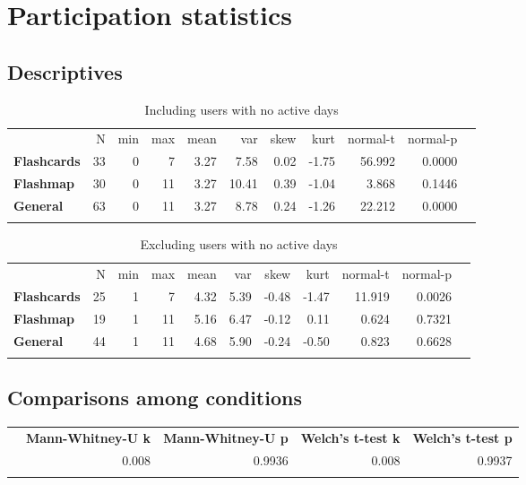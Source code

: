 \chapter{Participation statistics}
\label{app:dropouts}

\section{Descriptives}

\begin{longtable}[c]{@{}lrrrrrrrrrr@{}}
    \caption{Including users with no active days}
\endfirsthead
\toprule\addlinespace
& N & min & max & mean & var & skew & kurt & normal-t & normal-p
\\\addlinespace
\midrule
\textbf{Flashcards} & 33 & 0 & 7 & 3.27 & 7.58 & 0.02 & -1.75 & 56.992 &
0.0000
\\\addlinespace
\textbf{Flashmap} & 30 & 0 & 11 & 3.27 & 10.41 & 0.39 & -1.04 & 3.868 &
0.1446
\\\addlinespace
\textbf{General} & 63 & 0 & 11 & 3.27 & 8.78 & 0.24 & -1.26 & 22.212 &
0.0000
\\\addlinespace
\bottomrule
    \label{tab:dropouts_incl}
\end{longtable}

\begin{longtable}[c]{@{}lrrrrrrrrrr@{}}
    \caption{Excluding users with no active days}
\endfirsthead
\toprule\addlinespace
& N & min & max & mean & var & skew & kurt & normal-t & normal-p
\\\addlinespace
\midrule
\textbf{Flashcards} & 25 & 1 & 7 & 4.32 & 5.39 & -0.48 & -1.47 & 11.919
& 0.0026
\\\addlinespace
\textbf{Flashmap} & 19 & 1 & 11 & 5.16 & 6.47 & -0.12 & 0.11 & 0.624 &
0.7321
\\\addlinespace
\textbf{General} & 44 & 1 & 11 & 4.68 & 5.90 & -0.24 & -0.50 & 0.823 &
0.6628
\\\addlinespace
\bottomrule
    \label{tab:dropouts_excl}
\end{longtable}

\FloatBarrier
\section{Comparisons among conditions}

\begin{longtable}[c]{@{}lrrrr@{}}
\toprule\addlinespace
& \textbf{Mann-Whitney-U k} & \textbf{Mann-Whitney-U p} &
\textbf{Welch's t-test k} & \textbf{Welch's t-test p}
\\\addlinespace
\midrule\endhead
& 0.008 & 0.9936 & 0.008 & 0.9937
\\\addlinespace
\bottomrule
    \label{tab:dropouts-comp}
\end{longtable}

